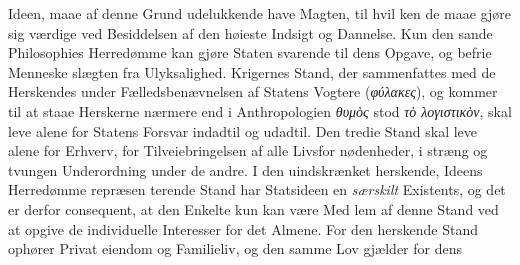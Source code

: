 \documentclass[12pt,a4paper]{book}
\newcommand{\gk}[1]{\textit{#1}}
\begin{document}
Ideen, maae af denne Grund udelukkende have Magten, til hvil\-%
ken de maae gjøre sig værdige ved Besiddelsen af den høieste
Indsigt og Dannelse. Kun den sande Philosophies Herredømme
kan gjøre Staten svarende til dens Opgave, og befrie Menneske\-%
slægten fra Ulyksalighed. Krigernes Stand, der sammenfattes
med de Herskendes under Fælledsbenævnelsen af Statens Vogtere
(\gk{φύλακες}), og kommer til at staae Herskerne nærmere end i
Anthropologien \gk{θυμὸς} stod \gk{τὸ λογιστικὸν}, skal leve alene for
Statens Forsvar indadtil og udadtil. Den tredie Stand skal
leve alene for Erhverv, for Tilveiebringelsen af alle Livsfor\-%
nødenheder, i stræng og tvungen Underordning under de andre.
I den uindskrænket herskende, Ideens Herredømme repræsen\-%
terende Stand har Statsideen en \emph{særskilt} Existents, og
det er derfor consequent, at den Enkelte kun kan være Med\-%
lem af denne Stand ved at opgive de individuelle Interesser
for det Almene. For den herskende Stand ophører Privat\-%
eiendom og Familieliv, og den samme Lov gjælder for dens
\end{document}
